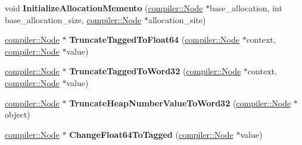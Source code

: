 \begin{DoxyCompactItemize}
\item 
void {\bfseries Initialize\+Allocation\+Memento} (\hyperlink{classv8_1_1internal_1_1compiler_1_1_node}{compiler\+::\+Node} $\ast$base\+\_\+allocation, int base\+\_\+allocation\+\_\+size, \hyperlink{classv8_1_1internal_1_1compiler_1_1_node}{compiler\+::\+Node} $\ast$allocation\+\_\+site)\hypertarget{classv8_1_1internal_1_1_code_stub_assembler_aa7f708573cf2f1400b498a7894cb121a}{}\label{classv8_1_1internal_1_1_code_stub_assembler_aa7f708573cf2f1400b498a7894cb121a}

\item 
\hyperlink{classv8_1_1internal_1_1compiler_1_1_node}{compiler\+::\+Node} $\ast$ {\bfseries Truncate\+Tagged\+To\+Float64} (\hyperlink{classv8_1_1internal_1_1compiler_1_1_node}{compiler\+::\+Node} $\ast$context, \hyperlink{classv8_1_1internal_1_1compiler_1_1_node}{compiler\+::\+Node} $\ast$value)\hypertarget{classv8_1_1internal_1_1_code_stub_assembler_aaf1824ea4e5bb6d51771d77220bf0021}{}\label{classv8_1_1internal_1_1_code_stub_assembler_aaf1824ea4e5bb6d51771d77220bf0021}

\item 
\hyperlink{classv8_1_1internal_1_1compiler_1_1_node}{compiler\+::\+Node} $\ast$ {\bfseries Truncate\+Tagged\+To\+Word32} (\hyperlink{classv8_1_1internal_1_1compiler_1_1_node}{compiler\+::\+Node} $\ast$context, \hyperlink{classv8_1_1internal_1_1compiler_1_1_node}{compiler\+::\+Node} $\ast$value)\hypertarget{classv8_1_1internal_1_1_code_stub_assembler_a019b3c473ae1daa4bc29d34674fca975}{}\label{classv8_1_1internal_1_1_code_stub_assembler_a019b3c473ae1daa4bc29d34674fca975}

\item 
\hyperlink{classv8_1_1internal_1_1compiler_1_1_node}{compiler\+::\+Node} $\ast$ {\bfseries Truncate\+Heap\+Number\+Value\+To\+Word32} (\hyperlink{classv8_1_1internal_1_1compiler_1_1_node}{compiler\+::\+Node} $\ast$object)\hypertarget{classv8_1_1internal_1_1_code_stub_assembler_a6a65080afdb75c8d5a66a06dee57d6ee}{}\label{classv8_1_1internal_1_1_code_stub_assembler_a6a65080afdb75c8d5a66a06dee57d6ee}

\item 
\hyperlink{classv8_1_1internal_1_1compiler_1_1_node}{compiler\+::\+Node} $\ast$ {\bfseries Change\+Float64\+To\+Tagged} (\hyperlink{classv8_1_1internal_1_1compiler_1_1_node}{compiler\+::\+Node} $\ast$value)\hypertarget{classv8_1_1internal_1_1_code_stub_assembler_ad4adf2bd28b5229b68823a6122cb1a3e}{}\label{classv8_1_1internal_1_1_code_stub_assembler_ad4adf2bd28b5229b68823a6122cb1a3e}


\end{DoxyCompactItemize}
